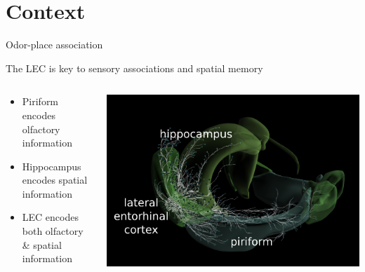 \documentclass[bigger]{beamer}
\begin{document}
\section*{Context}
\label{sec:org3f2fab2}
{%
\begin{frame}[fragile]{Odor-place association}
\addtocounter{framenumber}{-1}
\end{frame}
}
\begin{frame}[label={sec:org81e9e0b}]{The LEC is key to sensory associations and spatial memory}
\begin{columns}
\begin{column}{0.45\columnwidth}
\footnotesize
\begin{itemize}
\item \alert{Piriform} encodes olfactory information
\item \alert{Hippocampus} encodes spatial information
\item \alert{LEC} encodes both olfactory \& spatial information
\end{itemize}
\end{column}
\begin{column}{0.55\columnwidth}
\begin{center}
\includegraphics[width=\textwidth]{img/brain.png}
\end{center}
\end{column}
\end{columns}
\end{frame}
\end{document}
